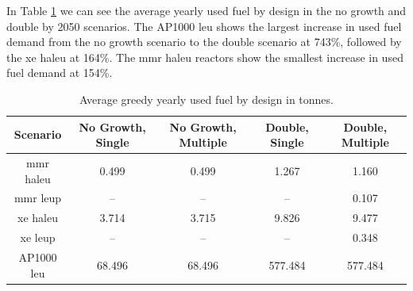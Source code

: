 In Table \ref{tab:greedy_used_avg} we can see the average yearly used fuel by design in the no growth and double by 2050 scenarios. The AP1000 \gls{leu} shows the largest increase in used fuel demand from the no growth scenario to the double scenario at 743\%, followed by the \gls{xe} \gls{haleu} at 164\%. The \gls{mmr} \gls{haleu} reactors show the smallest increase in used fuel demand at 154\%.


\begin{table}[H]
  \centering
  \caption{Average greedy yearly used fuel by design in tonnes.}
  \label{tab:greedy_used_avg}
  \begin{tabular}{c c c c c}
     \hline
     Scenario & No Growth, Single & No Growth, Multiple & Double, Single & Double, Multiple  \\
     \hline
     \gls{mmr} \gls{haleu}   & 0.499    & 0.499   & 1.267    & 1.160    \\
     \gls{mmr} \gls{leup}    & --       & --      & --       & 0.107    \\
     \gls{xe} \gls{haleu}    & 3.714    & 3.715   & 9.826    & 9.477    \\
     \gls{xe} \gls{leup}     & --       & --      & --       & 0.348    \\
     AP1000 \gls{leu}        & 68.496   & 68.496  & 577.484  & 577.484  \\
     \hline
  \end{tabular}
\end{table}


